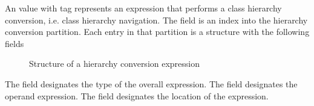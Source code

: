 An  value with tag  represents an expression that performs a class hierarchy conversion, i.e. class hierarchy navigation.
The  field is an index into the hierarchy conversion partition.  Each entry in that partition is a structure with the following fields
%
\begin{figure}[H]
	\centering
	\caption{Structure of a hierarchy conversion expression}
	\label{fig:ifc-hierarchy-conversion-expression-structure}
\end{figure}
%

The  field designates the type of the overall expression.
The field  designates the operand expression.
The field  designates the location of the expression.



\subsection{}
\label{sec:ifc:ExprSort:ProductTypeValue}

